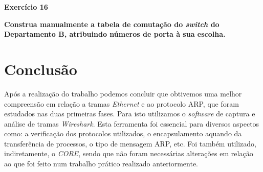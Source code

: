 \documentclass{article}
\begin{document}
\vspace{2cm}

\textbf{Exercício 16}\vspace{0.5cm}

\textbf{Construa manualmente a tabela de comutação do \textit{switch} do Departamento B, atribuindo números de porta à sua escolha.}


\vspace{0.5cm}
\clearpage

\section{Conclusão}\vspace{0.5cm}

Após a realização do trabalho podemos concluir que obtivemos uma melhor compreensão em relação a tramas \textit{Ethernet} e ao protocolo ARP, que foram estudados nas duas primeiras fases. Para isto utilizamos o \textit{software} de captura e análise de tramas \textit{Wireshark}. Esta ferramenta foi essencial para diversos aspectos como: a verificação dos protocolos utilizados, o encapsulamento aquando da transferência de processos, o tipo de mensagem ARP, etc.
Foi também utilizado, indiretamente, o \textit{CORE}, sendo que não foram necessárias alterações em relação ao que foi feito num trabalho prático realizado anteriormente. 
\end{document}
